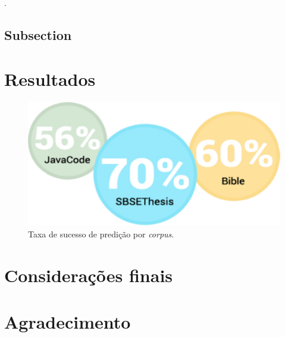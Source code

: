 \documentclass[isoft]{ufgposter}
\begin{document}
\begin{poster}
\lipsum[54]

\vspace{1cm}
\begin{table}
\centering
\captionsetup{type=table}
\caption{\textit{Corpus} utilizados no estudo}
\label{Corpus}
\renewcommand{\arraystretch}{1.2}
\end{table}
\vspace{1cm}

\lipsum[57]

\citep{defects2j}.

\subsection{Subsection}
\lipsum[8]

\section{Resultados}%

\begin{figure}
\centering
\captionsetup{type=figure}
\includegraphics[scale=2]{resultado}
\caption{Taxa de sucesso de predição por \textit{corpus}.}
\label{fig:result}
\end{figure}

\lipsum[5]
\cite{chollet2015keras}

\section{Considerações finais}

\lipsum[15]

\section{Agradecimento}

\lipsum[57]





\end{poster}
\end{document}
